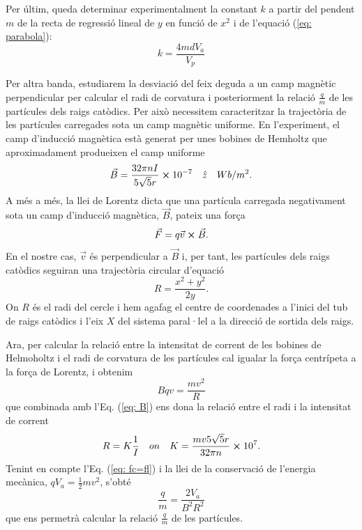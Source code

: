 \documentclass[11pt]{article}
\numberwithin{equation}{section}
\numberwithin{figure}{section}
\numberwithin{table}{section}
\begin{document}
Per últim, queda determinar experimentalment la constant $k$ a partir del pendent $m$ de la recta de regressió lineal de $y$ en funció de $x^2$ i de l'equació (\ref{eq: parabola}):
 \begin{equation}
      k =\frac{4mdV_a}{V_p}
      \label{eq: k}
 \end{equation}

\vspace{1cm}
Per altra banda, estudiarem la desviació del feix deguda a un camp magnètic perpendicular per calcular el radi de corvatura i posteriorment la relació $\frac{q}{m}$ de les partícules dels raigs catòdics. Per això necessitem caracteritzar la trajectòria de les partícules carregades sota un camp magnètic uniforme. En l'experiment, el camp d'inducció magnètica està generat per unes bobines de Hemholtz que aproximadament produeixen el camp uniforme 
\begin{equation}
    \vec{B}=\frac{32\pi nI}{5\sqrt{5}r}\cross10^{-7} \quad \hat{z}\quad Wb/m^2.
    \label{eq: B}
\end{equation}
A més a més, la llei de Lorentz dicta que una partícula carregada negativament sota un camp d'inducció magnètica, $\vec{B}$, pateix una força
\begin{equation}
    \vec{F}=q\vec{v}\cross\vec{B}.
    \label{eq: Lorentz} 
\end{equation} 
En el nostre cas, $\vec{v}$ és perpendicular a $\vec{B }$ i, per tant, les partícules dels raigs catòdics seguiran una trajectòria circular d'equació
\begin{equation}
    R=\frac{x^2+y^2}{2y}.
    \label{eq: radi}
\end{equation}
On $R$ és el radi del cercle i hem agafag el centre de coordenades a l'inici del tub de raigs catòdics i l'eix $X$ del sistema paral·lel a la direcció de sortida dels raigs.

Ara, per calcular la relació entre la intensitat de corrent de les bobines de Helmoholtz i el radi de corvatura de les partícules cal igualar la força centrípeta a la força de Lorentz, i obtenim 
\begin{equation}
    Bqv=\frac{mv^2}{R}
    \label{eq: fc=fl}
\end{equation}
que combinada amb l'Eq. (\ref{eq: B}) ens dona la relació entre el radi i la intensitat de corrent
\begin{equation}
    R=K\frac{1}{I} \quad on \quad K=\frac{mv5\sqrt{5}r}{32\pi n}\cross 10^7.
    \label{eq: IvsR}
\end{equation}
Tenint en compte l'Eq. (\ref{eq: fc=fl}) i la llei de la conservació de l'energia mecànica, $qV_a = \frac{1}{2}mv^2$, s'obté 
\begin{equation}
    \frac{q}{m}=\frac{2V_a }{B^2R^2}
    \label{eq: q/m}
\end{equation}
que ens permetrà calcular la relació $\frac{q}{m}$ de les partícules.
\end{document}
